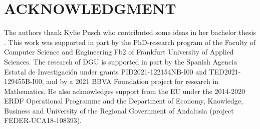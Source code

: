 \documentclass{ieeeaccess}
\begin{document}
\section{ACKNOWLEDGMENT}

The authors thank Kylie Pusch who contributed some ideas in her bachelor thesis \cite{Pusch}. This work was supported in part by the PhD-research program of the Faculty of Computer Science and Engineering Fb2 of Frankfurt University of Applied Sciences. The research of DGU is supported in part by the Spanish Agencia Estatal de Investigaci\'on under grants PID2021-122154NB-I00 and TED2021-129455B-I00, and by a 2021 BBVA Foundation project for research in Mathematics. He also acknowledges support from the EU under the 2014-2020 ERDF Operational Programme and the Department of Economy, Knowledge, Business and University of the Regional Government of Andalusia (project FEDER-UCA18-108393).
\end{document}
